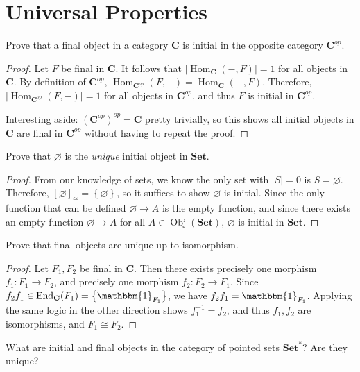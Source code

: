\documentclass[11pt]{report}
\DeclareMathOperator{\End}{End}
\DeclareMathOperator{\Hom}{Hom}
\DeclareMathOperator{\Obj}{Obj}
\begin{document}
\section{Universal Properties}
\begin{exercise}
	Prove that a final object in a category $\mathbf{C}$ is initial in the opposite category $\mathbf{C}^{op}$.
\end{exercise}
\begin{proof}
	Let $F$ be final in $\mathbf{C}$. It follows that $\left| \Hom_{ \mathbf{C} }(- , F)  \right| =1$ for all objects in $\mathbf{C}$. By definition of $\mathbf{C}^{op}$, $\Hom_{ \mathbf{C}^{op} }(F , -) = \Hom_{ \mathbf{C} }(- , F) $. Therefore, $\left| \Hom_{ \mathbf{C}^{op} }(F , -)  \right| =1$ for all objects in $\mathbf{C}^{op}$, and thus $F$ is initial in $\mathbf{C}^{op}$.

	Interesting aside: $\left( \mathbf{C}^{op} \right) ^{op}=\mathbf{C}$ pretty trivially, so this shows all initial objects in $\mathbf{C}$ are final in $\mathbf{C}^{op}$ without having to repeat the proof.
\end{proof}
\begin{exercise}
	Prove that $\varnothing$ is the \emph{unique} initial object in $\mathbf{Set}$.
\end{exercise}
\begin{proof}
	From our knowledge of sets, we know the only set with $\left| S \right| =0$ is $S=\varnothing$. Therefore, $[\varnothing]_{\cong} =\left\{ \varnothing \right\} $, so it suffices to show $\varnothing$ is initial. Since the only function that can be defined $\varnothing\to A$ is the empty function, and since there exists an empty function $\varnothing\to A$ for all $A\in \Obj( \mathbf{Set} ) $, $\varnothing$ is initial in $\mathbf{Set}$.
\end{proof}
\begin{exercise}
	Prove that final objects are unique up to isomorphism.
\end{exercise}
\begin{proof}
	Let $F_1,F_2$ be final in $\mathbf{C}$. Then there exists precisely one morphism $f_1: F_1 \to F_2$, and precisely one morphism $f_2: F_2 \to F_1$. Since $f_2f_1\in \End_{ \mathbf{C} }( F_1 )=\left\{ \mathbbm{1}_{F_1}  \right\} $, we have $f_2f_1=\mathbbm{1}_{F_1} $. Applying the same logic in the other direction shows $f_1^{-1}=f_2$, and thus $f_1,f_2$ are isomorphisms, and $F_1\cong F_2$.
\end{proof}
\begin{exercise}
	What are initial and final objects in the category of pointed sets $\mathbf{Set}^*$? Are they unique?
\end{exercise}
\end{document}
